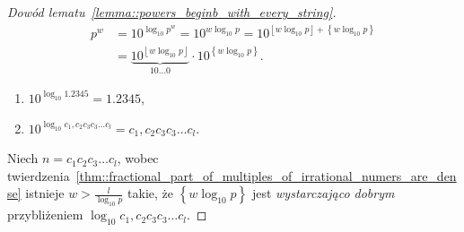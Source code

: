 \documentclass{beamer}
\newcommand{\enumsymbol}{$\triangleright$}
\newcommand{\floor}[1]{\left\lfloor #1 \right\rfloor}
\newcommand{\fracpart}[1]{\left\{ #1 \right\}}
\begin{document}
\begin{frame}
  \begin{proof}[Dowód lematu~\ref{lemma::powers_beginb_with_every_string}]
    \begin{align*}
      p^w &= 10^{\log_{10}p^w} = 10^{w \log_{10} p} = 10^{\floor{w \log_{10} p} + \fracpart{w \log_{10} p}} \\
          &= \underbrace{10^{\floor{w \log_{10} p}}}_{10\ldots 0}\cdot10^{\fracpart{w \log_{10} p}}.
    \end{align*}
    \begin{enumerate}[label=\enumsymbol]
      \item $10^{\log_{10} 1.2345} = 1.2345$,
      \item $10^{\log_{10} c_1,c_2c_3c_3 \ldots{} c_l} = c_1,c_2c_3c_3 \ldots{} c_l$.
    \end{enumerate}
    Niech $n = c_1c_2c_3 \ldots{} c_l$, wobec twierdzenia~\ref{thm::fractional_part_of_multiples_of_irrational_numers_are_dense} istnieje $w > \frac{l}{\log_{10}p}$ takie, że
    $\fracpart{w \log_{10} p}$ jest \textit{wystarczająco dobrym} przybliżeniem $\log_{10}{c_1,c_2c_3c_3 \ldots{} c_l}$.  
  \end{proof}
  
\end{frame}
\end{document}
